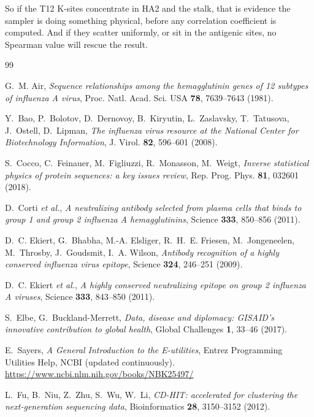 \documentclass[11pt,a4paper]{article}
\begin{document}
So if the T12 K-sites concentrate in HA2 and the stalk, that is evidence the
sampler is doing something physical, before any correlation coefficient is
computed. And if they scatter uniformly, or sit in the antigenic sites, no
Spearman value will rescue the result.

\begin{thebibliography}{99}

 G.~M. Air,
  \emph{Sequence relationships among the hemagglutinin genes of 12 subtypes of
  influenza A virus}, Proc. Natl. Acad. Sci. USA \textbf{78}, 7639--7643 (1981).

 Y.~Bao, P.~Bolotov, D.~Dernovoy, B.~Kiryutin, L.~Zaslavsky,
  T.~Tatusova, J.~Ostell, D.~Lipman,
  \emph{The influenza virus resource at the National Center for Biotechnology
  Information}, J. Virol. \textbf{82}, 596--601 (2008).

 S.~Cocco, C.~Feinauer, M.~Figliuzzi, R.~Monasson,
  M.~Weigt,
  \emph{Inverse statistical physics of protein sequences: a key issues review},
  Rep. Prog. Phys. \textbf{81}, 032601 (2018).

 D.~Corti \emph{et al.},
  \emph{A neutralizing antibody selected from plasma cells that binds to group 1
  and group 2 influenza A hemagglutinins}, Science \textbf{333}, 850--856
  (2011).

 D.~C. Ekiert, G.~Bhabha, M.-A. Elsliger, R.~H.~E. Friesen,
  M.~Jongeneelen, M.~Throsby, J.~Goudsmit, I.~A. Wilson,
  \emph{Antibody recognition of a highly conserved influenza virus epitope},
  Science \textbf{324}, 246--251 (2009).

 D.~C. Ekiert \emph{et al.},
  \emph{A highly conserved neutralizing epitope on group 2 influenza A
  viruses}, Science \textbf{333}, 843--850 (2011).

 S.~Elbe, G.~Buckland-Merrett,
  \emph{Data, disease and diplomacy: GISAID's innovative contribution to global
  health}, Global Challenges \textbf{1}, 33--46 (2017).

 E.~Sayers,
  \emph{A General Introduction to the E-utilities}, Entrez Programming
  Utilities Help, NCBI (updated continuously).
  \url{https://www.ncbi.nlm.nih.gov/books/NBK25497/}

 L.~Fu, B.~Niu, Z.~Zhu, S.~Wu, W.~Li,
  \emph{CD-HIT: accelerated for clustering the next-generation sequencing
  data}, Bioinformatics \textbf{28}, 3150--3152 (2012).


\end{thebibliography}
\end{document}
